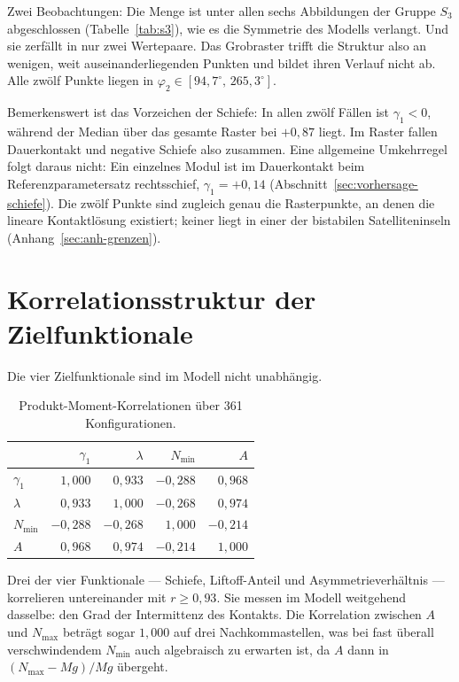 \documentclass[12pt,a4paper]{report}
\begin{document}
Zwei Beobachtungen: Die Menge ist unter allen sechs Abbildungen der
Gruppe $S_3$ abgeschlossen (Tabelle~\ref{tab:s3}), wie es die Symmetrie
des Modells verlangt. Und
sie zerfällt in nur zwei Wertepaare. Das Grobraster trifft die Struktur
also an wenigen, weit auseinanderliegenden Punkten und bildet ihren
Verlauf nicht ab. Alle zwölf Punkte liegen in
$\varphi_2 \in [94{,}7^\circ,\, 265{,}3^\circ]$.

Bemerkenswert ist das Vorzeichen der Schiefe: In allen zwölf Fällen ist
$\gamma_1 < 0$, während der Median über das gesamte Raster bei $+0{,}87$
liegt. Im Raster fallen Dauerkontakt und negative Schiefe also zusammen.
Eine allgemeine Umkehrregel folgt daraus nicht: Ein einzelnes Modul ist
im Dauerkontakt beim Referenzparametersatz rechtsschief,
$\gamma_1 = +0{,}14$ (Abschnitt~\ref{sec:vorhersage-schiefe}). Die zwölf
Punkte sind zugleich genau die Rasterpunkte, an denen die lineare
Kontaktlösung existiert; keiner liegt in einer der bistabilen
Satelliteninseln (Anhang~\ref{sec:anh-grenzen}).

\section{Korrelationsstruktur der Zielfunktionale}
\label{sec:korrelation}

Die vier Zielfunktionale sind im Modell nicht unabhängig.

\begin{table}[htbp]
  \centering
  \begin{tabular}{lrrrr}
    \hline
     & $\gamma_1$ & $\lambda$ & $N_{\min}$ & $A$ \\
    \hline
    $\gamma_1$   & $1{,}000$ & $0{,}933$ & $-0{,}288$ & $0{,}968$ \\
    $\lambda$    & $0{,}933$ & $1{,}000$ & $-0{,}268$ & $0{,}974$ \\
    $N_{\min}$   & $-0{,}288$ & $-0{,}268$ & $1{,}000$ & $-0{,}214$ \\
    $A$          & $0{,}968$ & $0{,}974$ & $-0{,}214$ & $1{,}000$ \\
    \hline
  \end{tabular}
  \caption{Produkt-Moment-Korrelationen über 361 Konfigurationen.}
  \label{tab:korrelation}
\end{table}

Drei der vier Funktionale --- Schiefe, Liftoff-Anteil und
Asymmetrieverhältnis --- korrelieren untereinander mit
$r \geq 0{,}93$. Sie messen im Modell weitgehend dasselbe: den Grad der
Intermittenz des Kontakts. Die Korrelation zwischen $A$ und $N_{\max}$
beträgt sogar $1{,}000$ auf drei Nachkommastellen, was bei fast überall
verschwindendem $N_{\min}$ auch algebraisch zu erwarten ist, da $A$ dann
in $(N_{\max}-Mg)/Mg$ übergeht.
\end{document}
